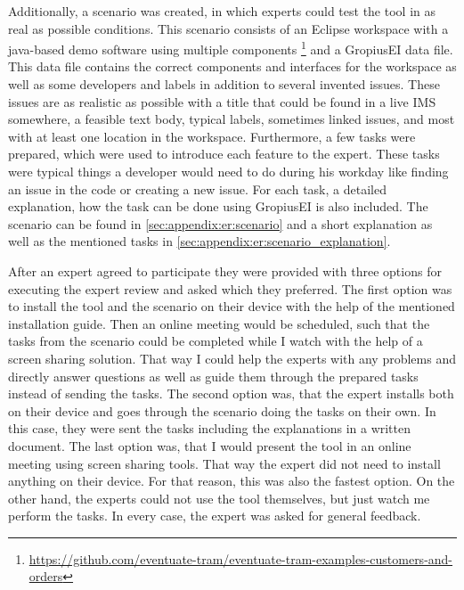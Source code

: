 Additionally, a scenario was created, in which experts could test the tool in as real as possible conditions.
This scenario consists of an \gls{Eclipse} workspace with a java-based demo software using multiple components \footnote{\url{https://github.com/eventuate-tram/eventuate-tram-examples-customers-and-orders}} and a \gls{GropiusEI} data file.
This data file contains the correct components and interfaces for the workspace as well as some developers and labels in addition to
several invented issues.
These issues are as realistic as possible with a title that could be found in a live \gls{IMS} somewhere, a feasible text body,
typical labels, sometimes linked issues, and most with at least one location in the workspace.
Furthermore, a few tasks were prepared, which were used to introduce each feature to the expert.
These tasks were typical things a developer would need to do during his workday like finding an issue in the code or creating a new issue.
For each task, a detailed explanation, how the task can be done using \gls{GropiusEI} is also included. 
The scenario can be found in \cref{sec:appendix:er:scenario} and a short explanation as well as the mentioned tasks in \cref{sec:appendix:er:scenario_explanation}.

After an expert agreed to participate they were provided with three options for executing the expert review and asked which they preferred.
The first option was to install the tool and the scenario on their device with the help of the mentioned installation guide.
Then an online meeting would be scheduled, such that the tasks from the scenario could be completed while I watch with the help of a screen sharing solution. That way I could help the experts with any problems and directly answer questions as well as guide them through the prepared tasks instead of sending the tasks.
The second option was, that the expert installs both on their device and goes through the scenario doing the tasks on their own.
In this case, they were sent the tasks including the explanations in a written document.
The last option was, that I would present the tool in an online meeting using screen sharing tools. 
That way the expert did not need to install anything on their device. 
For that reason, this was also the fastest option. 
On the other hand, the experts could not use the tool themselves, but just watch me perform the tasks.
In every case, the expert was asked for general feedback.

